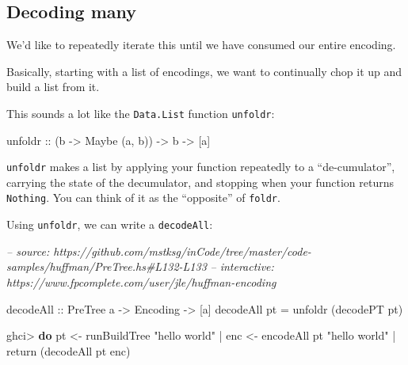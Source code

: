 \documentclass[]{article}
\newenvironment{Shaded}{}{}
\newcommand{\CommentTok}[1]{\textcolor[rgb]{0.38,0.63,0.69}{\textit{#1}}}
\newcommand{\DataTypeTok}[1]{\textcolor[rgb]{0.56,0.13,0.00}{#1}}
\newcommand{\FunctionTok}[1]{\textcolor[rgb]{0.02,0.16,0.49}{#1}}
\newcommand{\KeywordTok}[1]{\textcolor[rgb]{0.00,0.44,0.13}{\textbf{#1}}}
\newcommand{\NormalTok}[1]{#1}
\newcommand{\OtherTok}[1]{\textcolor[rgb]{0.00,0.44,0.13}{#1}}
\newcommand{\StringTok}[1]{\textcolor[rgb]{0.25,0.44,0.63}{#1}}
\begin{document}
\hypertarget{decoding-many}{%
\subsection{Decoding many}\label{decoding-many}}

We'd like to repeatedly iterate this until we have consumed our entire encoding.

Basically, starting with a list of encodings, we want to continually chop it up
and build a list from it.

This sounds a lot like the \texttt{Data.List} function \texttt{unfoldr}:

\begin{Shaded}
\begin{Highlighting}[]
\OtherTok{unfoldr ::}\NormalTok{ (b }\OtherTok{->} \DataTypeTok{Maybe}\NormalTok{ (a, b)) }\OtherTok{->}\NormalTok{ b }\OtherTok{->}\NormalTok{ [a]}
\end{Highlighting}
\end{Shaded}

\texttt{unfoldr} makes a list by applying your function repeatedly to a
``de-cumulator'', carrying the state of the decumulator, and stopping when your
function returns \texttt{Nothing}. You can think of it as the ``opposite'' of
\texttt{foldr}.

Using \texttt{unfoldr}, we can write a \texttt{decodeAll}:

\begin{Shaded}
\begin{Highlighting}[]
\CommentTok{-- source: https://github.com/mstksg/inCode/tree/master/code-samples/huffman/PreTree.hs#L132-L133}
\CommentTok{-- interactive: https://www.fpcomplete.com/user/jle/huffman-encoding}

\OtherTok{decodeAll ::} \DataTypeTok{PreTree}\NormalTok{ a }\OtherTok{->} \DataTypeTok{Encoding} \OtherTok{->}\NormalTok{ [a]}
\NormalTok{decodeAll pt }\FunctionTok{=}\NormalTok{ unfoldr (decodePT pt)}
\end{Highlighting}
\end{Shaded}

\begin{Shaded}
\begin{Highlighting}[]
\NormalTok{ghci}\FunctionTok{>} \KeywordTok{do}\NormalTok{ pt  }\OtherTok{<-}\NormalTok{ runBuildTree }\StringTok{"hello world"}
 \FunctionTok{|}\NormalTok{    enc }\OtherTok{<-}\NormalTok{ encodeAll pt }\StringTok{"hello world"}
 \FunctionTok{|}\NormalTok{    return (decodeAll pt enc)}
\end{Highlighting}
\end{Shaded}
\end{document}
